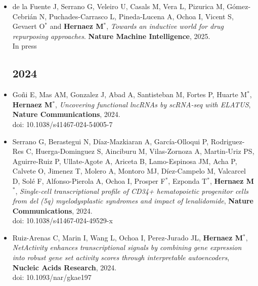 \documentclass[11pt,a4paper,sans]{moderncv}        %
\begin{document}
\begin{itemize}


\item de la Fuente J, Serrano G, Veleiro U, Casals M, Vera L, Pizurica M, Gómez-Cebrián N, Puchades-Carrasco L, Pineda-Lucena A, Ochoa I, Vicent S, Gevaert O$^{\ast}$ and \textbf{Hernaez M}$^{\ast}$, \textsl{Towards an inductive world for drug repurposing approaches}. \textbf{Nature Machine Intelligence}, 2025. \\
In press\\


\subsection{2024}
\vspace{6pt}

\item Goñi E, Mas AM, Gonzalez J, Abad A, Santisteban M, Fortes P, Huarte M$^{\ast}$, \textbf{Hernaez M}$^{\ast}$, \textsl{Uncovering functional lncRNAs by scRNA-seq with ELATUS}, \textbf{Nature Communications}, 2024.\\
doi: 10.1038/s41467-024-54005-7\\

\item Serrano G, Berastegui N, Díaz-Mazkiaran A, García-Olloqui P, Rodriguez-Res C, Huerga-Dominguez S, Ainciburu M, Vilas-Zornoza A, Martin-Uriz PS, Aguirre-Ruiz P, Ullate-Agote A, Ariceta B, Lamo-Espinosa JM, Acha P, Calvete O, Jimenez T, Molero A, Montoro MJ, Díez-Campelo M, Valcarcel D, Solé F, Alfonso-Pierola A, Ochoa I, Prosper F$^{\ast}$, Ezponda T$^{\ast}$, \textbf{Hernaez M}$^{\ast}$, \textsl{Single-cell transcriptional profile of CD34+ hematopoietic progenitor cells from del (5q) myelodysplastic syndromes and impact of lenalidomide}, \textbf{Nature Communications}, 2024.\\
doi: 10.1038/s41467-024-49529-x\\

\item Ruiz-Arenas C, Marin I, Wang L, Ochoa I, Perez-Jurado JL, \textbf{Hernaez M}$^{\ast}$, \textsl{NetActivity enhances transcriptional signals by combining gene expression into robust gene set activity scores through interpretable autoencoders}, \textbf{Nucleic Acids Research}, 2024.\\
doi: 10.1093/nar/gkae197\\


\end{itemize}
\end{document}

